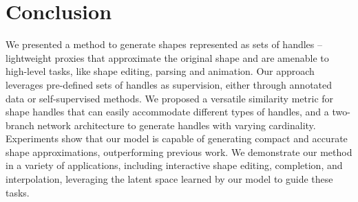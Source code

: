 \section{Conclusion}
We presented a method to generate shapes represented as
sets of handles -- lightweight proxies that approximate the original
shape and are amenable to high-level tasks, like shape editing, parsing and animation.
Our approach leverages pre-defined sets of handles as supervision, either through annotated data or self-supervised methods. 
We proposed a versatile similarity metric for shape handles that can easily accommodate different types of handles, and a two-branch network architecture to generate handles with varying cardinality.
Experiments show that our model is capable of generating compact and accurate
shape approximations, outperforming previous work. We demonstrate our method in a variety of applications, including interactive shape editing, completion, and interpolation, leveraging the latent space learned by our model to guide these tasks.